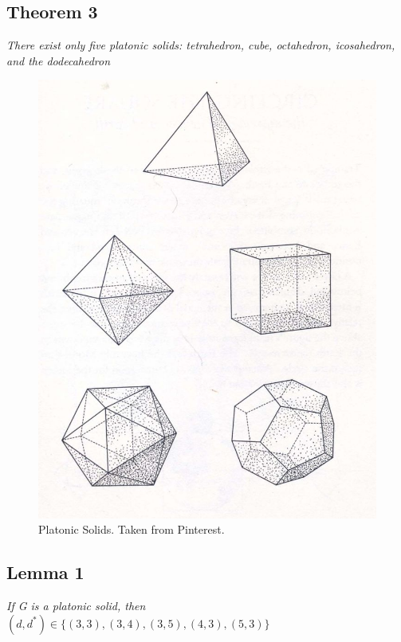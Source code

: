 \documentclass{report}
\begin{document}
\subsection{Theorem 3}
\begin{center}
\textit{There exist only five platonic solids: tetrahedron, cube, octahedron, icosahedron, and the dodecahedron}
\begin{figure}[ht]
\begin{center}
\includegraphics[scale=0.2]{platonic_solids.jpg}
\end{center}
\caption{Platonic Solids. Taken from Pinterest.}
\end{figure}

\end{center}
\subsection{Lemma 1}
\begin{center}
\textit{If G is a platonic solid, then $(d, d^*) \in \{(3, 3),(3,4),(3,5),(4,3),(5,3)\}$}
\end{center}
\end{document}
